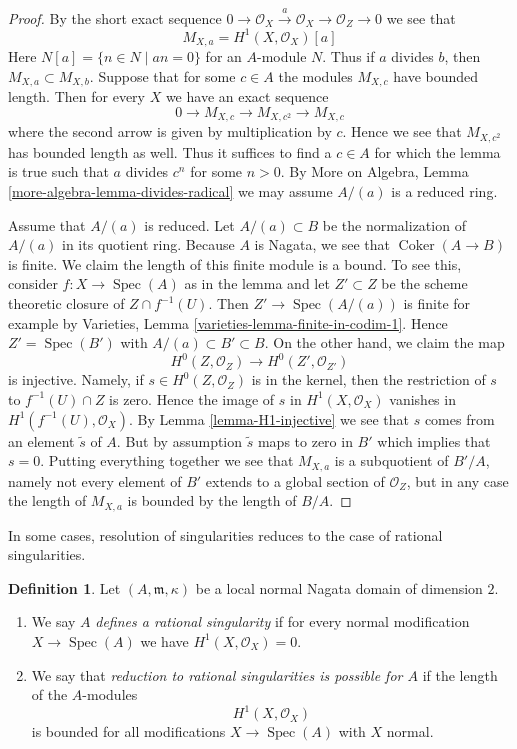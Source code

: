 \documentclass{stacks-project}
\theoremstyle{plain}
\theoremstyle{definition}
\newtheorem{definition}[subsection]{Definition}
\theoremstyle{remark}
\numberwithin{equation}{subsection}
\def\Spec{\mathop{\mathrm{Spec}}}
\def\Coker{\mathop{\mathrm{Coker}}}
\begin{document}
\begin{proof}
By the short exact sequence
$
0 \to \mathcal{O}_X \xrightarrow{a} \mathcal{O}_X \to \mathcal{O}_Z \to 0
$
we see that
\begin{equation}
\label{equation-a-torsion}
M_{X, a} = H^1(X, \mathcal{O}_X)[a]
\end{equation}
Here $N[a] = \{n \in N \mid an = 0\}$ for an $A$-module $N$. Thus
if $a$ divides $b$, then $M_{X, a} \subset M_{X, b}$.
Suppose that for some $c \in A$ the modules $M_{X, c}$
have bounded length. Then for every $X$ we have an exact sequence
$$
0 \to M_{X, c} \to M_{X, c^2} \to M_{X, c}
$$
where the second arrow is given by multiplication by $c$. Hence we see that
$M_{X, c^2}$ has bounded length as well. Thus it suffices to find a $c \in A$
for which the lemma is true such that $a$ divides $c^n$ for some $n > 0$.
By More on Algebra, Lemma \ref{more-algebra-lemma-divides-radical}
we may assume $A/(a)$ is a reduced ring.

\medskip\noindent
Assume that $A/(a)$ is reduced. Let $A/(a) \subset B$ be the normalization
of $A/(a)$ in its quotient ring. Because $A$ is Nagata, we see that
$\Coker(A \to B)$ is finite. We claim the length of this finite
module is a bound. To see this, consider $f : X \to \Spec(A)$ as in the lemma
and let $Z' \subset Z$ be the scheme theoretic closure of $Z \cap f^{-1}(U)$.
Then $Z' \to \Spec(A/(a))$ is finite for example by Varieties, Lemma
\ref{varieties-lemma-finite-in-codim-1}.
Hence $Z' = \Spec(B')$ with $A/(a) \subset B' \subset B$.
On the other hand, we claim the map
$$
H^0(Z, \mathcal{O}_Z) \to H^0(Z', \mathcal{O}_{Z'})
$$
is injective. Namely, if $s \in H^0(Z, \mathcal{O}_Z)$
is in the kernel, then
the restriction of $s$ to $f^{-1}(U) \cap Z$ is zero.
Hence the image of $s$ in $H^1(X, \mathcal{O}_X)$ vanishes in
$H^1(f^{-1}(U), \mathcal{O}_X)$. By Lemma \ref{lemma-H1-injective}
we see that $s$ comes from an element $\tilde s$ of $A$. But by
assumption $\tilde s$ maps to zero in $B'$ which implies that $s = 0$.
Putting everything together we see that
$M_{X, a}$ is a subquotient of $B'/A$, namely not every element
of $B'$ extends to a global section of $\mathcal{O}_Z$, but in
any case the length of $M_{X, a}$ is bounded by the length of $B/A$.
\end{proof}

\noindent
In some cases, resolution of singularities reduces to the case
of rational singularities.

\begin{definition}
\label{definition-reduce-to-rational}
Let $(A, \mathfrak m, \kappa)$ be a local normal Nagata domain
of dimension $2$.
\begin{enumerate}
\item We say $A$ {\it defines a rational singularity} if for every
normal modification $X \to \Spec(A)$ we have $H^1(X, \mathcal{O}_X) = 0$.
\item We say that {\it reduction to rational singularities
is possible for $A$} if the length of the $A$-modules
$$
H^1(X, \mathcal{O}_X)
$$
is bounded for all modifications $X \to \Spec(A)$ with $X$ normal.
\end{enumerate}
\end{definition}
\end{document}
